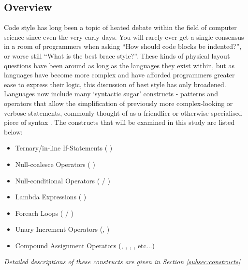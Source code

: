 \documentclass{article}
\begin{document}
    \subsection{Overview}
    \label{sec:overview}
        Code style has long been a topic of heated debate within the field of computer science since even the very early days. You will rarely ever get a single consensus in a room of programmers when asking ``How should code blocks be indented?'', or worse still ``What is the best brace style?''. These kinds of physical layout questions have been around as long as the languages they exist within, but as languages have become more complex and have afforded programmers greater ease to express their logic, this discussion of best style has only broadened. Languages now include many `syntactic sugar' constructs - patterns and operators that allow the simplification of previously more complex-looking or verbose statements, commonly thought of as a friendlier or otherwise specialised piece of syntax \citep{syntacticSugar}. The constructs that will be examined in this study are listed below:

        \begin{itemize}
            \item Ternary/in-line If-Statements (  )
            \item Null-coalesce Operators (  )
            \item Null-conditional Operators (  / )
            \item Lambda Expressions (  )
            \item Foreach Loops (  / )
            \item Unary Increment Operators (, )
            \item Compound Assignment Operators (,  , , , etc...)
        \end{itemize}
        
        \emph{Detailed descriptions of these constructs are given in Section \ref{subsec:constructs}}\\
\end{document}
